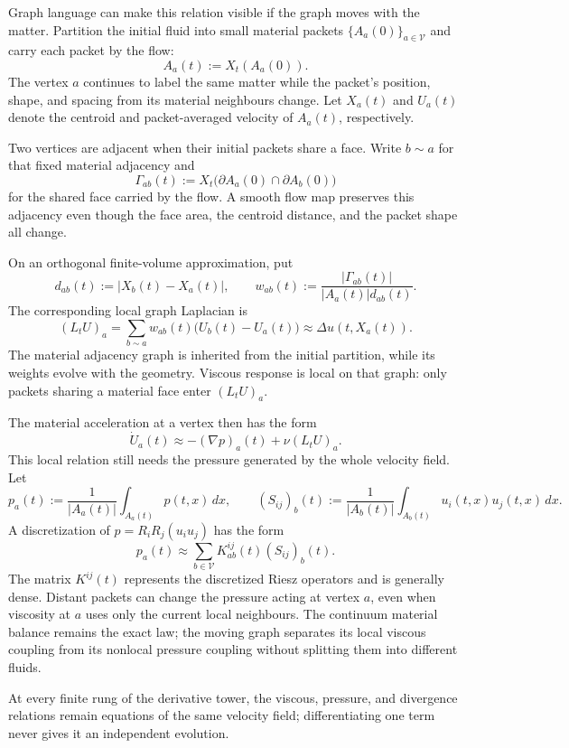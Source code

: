 
Graph language can make this relation visible if the graph moves with the matter.
Partition the initial fluid into small material packets \(\{A_a(0)\}_{a\in\mathcal V}\) and carry each packet by the flow:
\[
  A_a(t):=X_t(A_a(0)).
\]
The vertex \(a\) continues to label the same matter while the packet's position, shape, and spacing from its material neighbours change.
Let \(X_a(t)\) and \(U_a(t)\) denote the centroid and packet-averaged velocity of \(A_a(t)\), respectively.

Two vertices are adjacent when their initial packets share a face.
Write \(b\sim a\) for that fixed material adjacency and
\[
  \Gamma_{ab}(t)
  :=
  X_t\bigl(\partial A_a(0)\cap\partial A_b(0)\bigr)
\]
for the shared face carried by the flow.
A smooth flow map preserves this adjacency even though the face area, the centroid distance, and the packet shape all change.

On an orthogonal finite-volume approximation, put
\[
  d_{ab}(t):=|X_b(t)-X_a(t)|,
  \qquad
  w_{ab}(t)
  :=
  \frac{|\Gamma_{ab}(t)|}{|A_a(t)|d_{ab}(t)}.
\]
The corresponding local graph Laplacian is
\[
  (L_tU)_a
  =
  \sum_{b\sim a}
  w_{ab}(t)\bigl(U_b(t)-U_a(t)\bigr)
  \approx
  \Delta u(t,X_a(t)).
\]
The material adjacency graph is inherited from the initial partition, while its weights evolve with the geometry.
Viscous response is local on that graph: only packets sharing a material face enter \((L_tU)_a\).

The material acceleration at a vertex then has the form
\[
  \dot U_a(t)
  \approx
  -(\nabla p)_a(t)
  +
  \nu(L_tU)_a.
\]
This local relation still needs the pressure generated by the whole velocity field.
Let
\[
  p_a(t)
  :=
  \frac{1}{|A_a(t)|}
  \int_{A_a(t)}p(t,x)\,dx,
  \qquad
  (S_{ij})_b(t)
  :=
  \frac{1}{|A_b(t)|}
  \int_{A_b(t)}u_i(t,x)u_j(t,x)\,dx.
\]
A discretization of \(p=R_iR_j(u_i u_j)\) has the form
\[
  p_a(t)
  \approx
  \sum_{b\in\mathcal V}
  K_{ab}^{ij}(t)
  (S_{ij})_b(t).
\]
The matrix \(K^{ij}(t)\) represents the discretized Riesz operators and is generally dense.
Distant packets can change the pressure acting at vertex \(a\), even when viscosity at \(a\) uses only the current local neighbours.
The continuum material balance remains the exact law; the moving graph separates its local viscous coupling from its nonlocal pressure coupling without splitting them into different fluids.

At every finite rung of the derivative tower, the viscous, pressure, and divergence relations remain equations of the same velocity field; differentiating one term never gives it an independent evolution.

